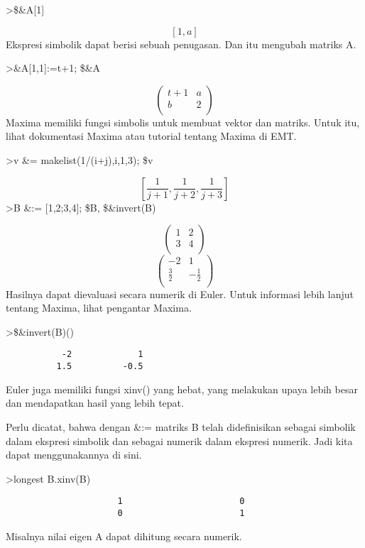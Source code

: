 \documentclass[
]{book}
\begin{document}
\textgreater\$\&A{[}1{]}

\[\left[ 1 , a \right]\]Ekspresi simbolik dapat berisi sebuah penugasan. Dan itu mengubah matriks A.

\textgreater\&A{[}1,1{]}:=t+1; \$\&A

\[\begin{pmatrix}t+1 & a \\ b & 2 \\ \end{pmatrix}\]Maxima memiliki fungsi simbolis untuk membuat vektor dan matriks. Untuk itu, lihat dokumentasi Maxima atau tutorial tentang Maxima di EMT.

\textgreater v \&= makelist(1/(i+j),i,1,3); \$v

\[\left[ \frac{1}{j+1} , \frac{1}{j+2} , \frac{1}{j+3} \right]\]\textgreater B \&:= {[}1,2;3,4{]}; \$B, \$\&invert(B)

\[\begin{pmatrix}1 & 2 \\ 3 & 4 \\ \end{pmatrix}\] \[\begin{pmatrix}-2 & 1 \\ \frac{3}{2} & -\frac{1}{2} \\ \end{pmatrix}\]Hasilnya dapat dievaluasi secara numerik di Euler. Untuk informasi lebih lanjut tentang Maxima, lihat pengantar Maxima.

\textgreater\$\&invert(B)()

\begin{verbatim}
           -2             1 
          1.5          -0.5 
\end{verbatim}

Euler juga memiliki fungsi xinv() yang hebat, yang melakukan upaya lebih besar dan mendapatkan hasil yang lebih tepat.

Perlu dicatat, bahwa dengan \&:= matriks B telah didefinisikan sebagai simbolik dalam ekspresi simbolik dan sebagai numerik dalam ekspresi numerik. Jadi kita dapat menggunakannya di sini.

\textgreater longest B.xinv(B)

\begin{verbatim}
                      1                       0 
                      0                       1 
\end{verbatim}

Misalnya nilai eigen A dapat dihitung secara numerik.
\end{document}
